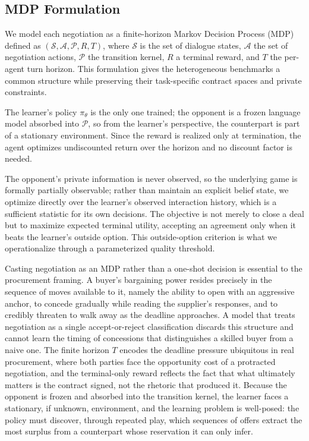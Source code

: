 \documentclass{interact}
\theoremstyle{plain}
\theoremstyle{definition}
\theoremstyle{remark}
\begin{document}
\subsection{MDP Formulation}

We model each negotiation as a finite-horizon Markov Decision Process (MDP) defined as $(\mathcal{S}, \mathcal{A}, \mathcal{P}, R, T)$, where $\mathcal{S}$ is the set of dialogue states, $\mathcal{A}$ the set of negotiation actions, $\mathcal{P}$ the transition kernel, $R$ a terminal reward, and $T$ the per-agent turn horizon. This formulation gives the heterogeneous benchmarks a common structure while preserving their task-specific contract spaces and private constraints.

The learner's policy $\pi_\theta$ is the only one trained; the opponent is a frozen language model absorbed into $\mathcal{P}$, so from the learner's perspective, the counterpart is part of a stationary environment. Since the reward is realized only at termination, the agent optimizes undiscounted return over the horizon and no discount factor is needed.

The opponent's private information is never observed, so the underlying game is formally partially observable; rather than maintain an explicit belief state, we optimize directly over the learner's observed interaction history, which is a sufficient statistic for its own decisions. The objective is not merely to close a deal but to maximize expected terminal utility, accepting an agreement only when it beats the learner's outside option. This outside-option criterion is what we operationalize through a parameterized quality threshold.

Casting negotiation as an MDP rather than a one-shot decision is essential to the procurement framing. A buyer's bargaining power resides precisely in the sequence of moves available to it, namely the ability to open with an aggressive anchor, to concede gradually while reading the supplier's responses, and to credibly threaten to walk away as the deadline approaches. A model that treats negotiation as a single accept-or-reject classification discards this structure and cannot learn the timing of concessions that distinguishes a skilled buyer from a naive one. The finite horizon $T$ encodes the deadline pressure ubiquitous in real procurement, where both parties face the opportunity cost of a protracted negotiation, and the terminal-only reward reflects the fact that what ultimately matters is the contract signed, not the rhetoric that produced it. Because the opponent is frozen and absorbed into the transition kernel, the learner faces a stationary, if unknown, environment, and the learning problem is well-posed: the policy must discover, through repeated play, which sequences of offers extract the most surplus from a counterpart whose reservation it can only infer.
\end{document}
